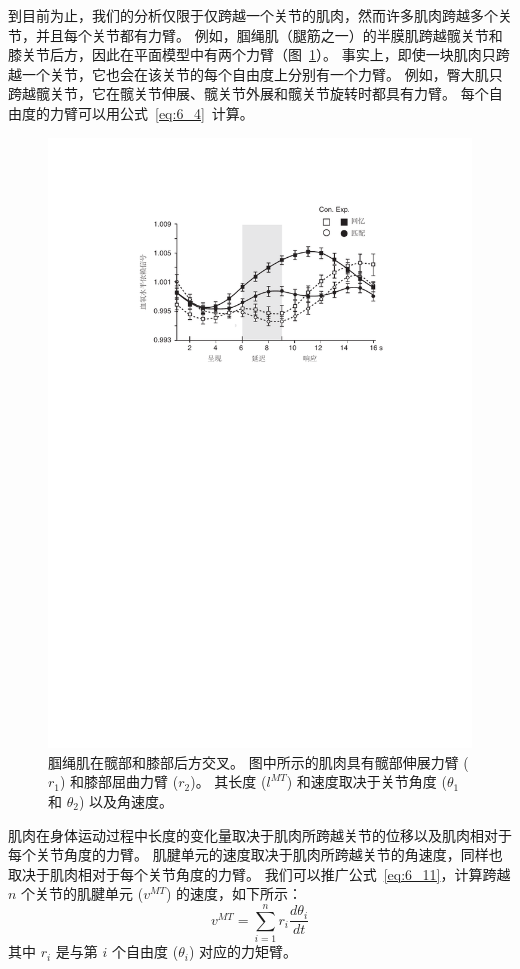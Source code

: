 到目前为止，我们的分析仅限于仅跨越一个关节的肌肉，然而许多肌肉跨越多个关节，并且每个关节都有力臂。
例如，腘绳肌（腿筋之一）的半膜肌跨越髋关节和膝关节后方，因此在平面模型中有两个力臂（图~\ref{fig:6_9}）。
事实上，即使一块肌肉只跨越一个关节，它也会在该关节的每个自由度上分别有一个力臂。
例如，臀大肌只跨越髋关节，它在髋关节伸展、髋关节外展和髋关节旋转时都具有力臂。
每个自由度的力臂可以用公式~\ref{eq:6_4}~计算。


\begin{figure}[!htb]
	\centering
	\includegraphics[width=0.8\linewidth]{chap6/6_9}
	\caption{腘绳肌在髋部和膝部后方交叉。
		图中所示的肌肉具有髋部伸展力臂 ($r_1$) 和膝部屈曲力臂 ($r_2$)。
		其长度 ($l^{MT}$) 和速度取决于关节角度 ($\theta_1$ 和 $\theta_2$) 以及角速度。 \label{fig:6_9}}
\end{figure}


肌肉在身体运动过程中长度的变化量取决于肌肉所跨越关节的位移以及肌肉相对于每个关节角度的力臂。
肌腱单元的速度取决于肌肉所跨越关节的角速度，同样也取决于肌肉相对于每个关节角度的力臂。
我们可以推广公式~\ref{eq:6_11}，计算跨越 $n$ 个关节的肌腱单元 ($v^{MT}$) 的速度，如下所示：
%
\begin{equation}
	v^{MT} = 
		\sum_{i=1}^{n}
			r_i
			\frac{d \theta_i}{d t}
	\label{eq:6_12}
\end{equation}
%
其中 $r_i$ 是与第 $i$ 个自由度 ($\theta_i$) 对应的力矩臂。


